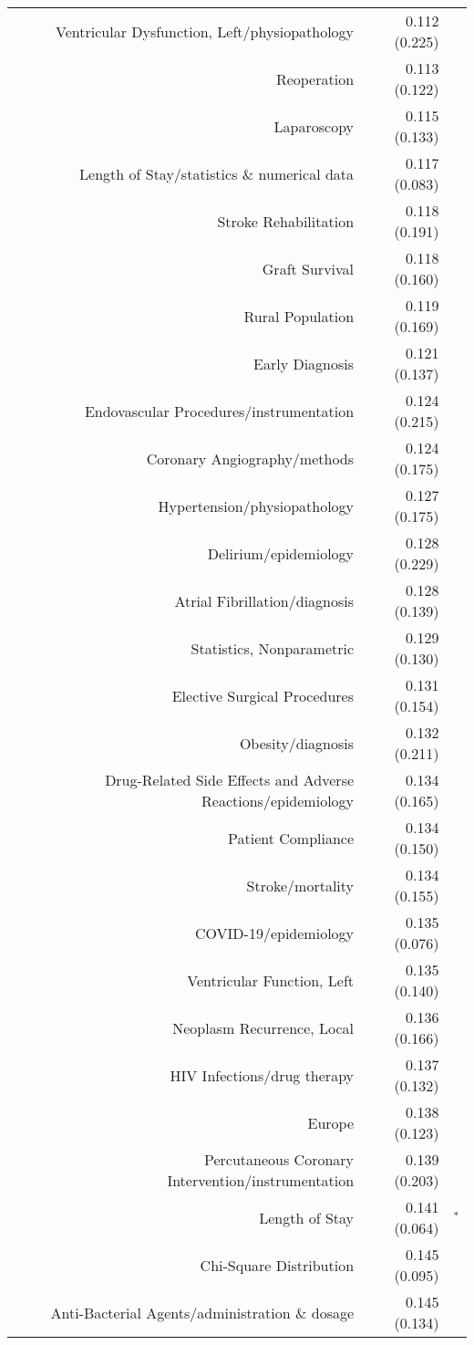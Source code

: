 \begin{longtable}[l]{rr@{}l@{ }}
Ventricular Dysfunction, Left/physiopathology & 0.112 (0.225) & $^{}$\\
Reoperation & 0.113 (0.122) & $^{}$\\
Laparoscopy & 0.115 (0.133) & $^{}$\\
Length of Stay/statistics \& numerical data & 0.117 (0.083) & $^{}$\\
Stroke Rehabilitation & 0.118 (0.191) & $^{}$\\
Graft Survival & 0.118 (0.160) & $^{}$\\
Rural Population & 0.119 (0.169) & $^{}$\\
Early Diagnosis & 0.121 (0.137) & $^{}$\\
Endovascular Procedures/instrumentation & 0.124 (0.215) & $^{}$\\
Coronary Angiography/methods & 0.124 (0.175) & $^{}$\\
Hypertension/physiopathology & 0.127 (0.175) & $^{}$\\
Delirium/epidemiology & 0.128 (0.229) & $^{}$\\
Atrial Fibrillation/diagnosis & 0.128 (0.139) & $^{}$\\
Statistics, Nonparametric & 0.129 (0.130) & $^{}$\\
Elective Surgical Procedures & 0.131 (0.154) & $^{}$\\
Obesity/diagnosis & 0.132 (0.211) & $^{}$\\
Drug-Related Side Effects and Adverse Reactions/epidemiology & 0.134 (0.165) & $^{}$\\
Patient Compliance & 0.134 (0.150) & $^{}$\\
Stroke/mortality & 0.134 (0.155) & $^{}$\\
COVID-19/epidemiology & 0.135 (0.076) & $^{}$\\
Ventricular Function, Left & 0.135 (0.140) & $^{}$\\
Neoplasm Recurrence, Local & 0.136 (0.166) & $^{}$\\
HIV Infections/drug therapy & 0.137 (0.132) & $^{}$\\
Europe & 0.138 (0.123) & $^{}$\\
Percutaneous Coronary Intervention/instrumentation & 0.139 (0.203) & $^{}$\\
Length of Stay & 0.141 (0.064) & $^{*}$\\
Chi-Square Distribution & 0.145 (0.095) & $^{}$\\
Anti-Bacterial Agents/administration \& dosage & 0.145 (0.134) & $^{}$\\

\end{longtable}
